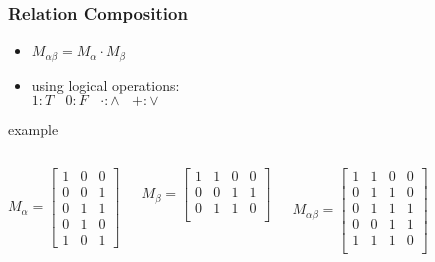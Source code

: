 \documentclass[dvipsnames]{beamer}
\begin{document}
\begin{frame}
  \frametitle{Relation Composition}

  \begin{itemize}
    \item $M_{\alpha \beta} = M_{\alpha} \cdot M_{\beta}$
    \item using logical operations:\\
      $1:T~~~~0:F~~~~\cdot:\wedge~~~~+:\vee$
  \end{itemize}

  \pause
  \begin{exampleblock}{example}
    \begin{columns}
      \[
        M_\alpha =
          \left[
            \begin{array}{ccc}
              1 & 0 & 0\\
              0 & 0 & 1\\
              0 & 1 & 1\\
              0 & 1 & 0\\
              1 & 0 & 1
           \end{array}
         \right]
      \]

      \[
        M_\beta =
          \left[
            \begin{array}{cccc}
              1 & 1 & 0 & 0\\
              0 & 0 & 1 & 1\\
              0 & 1 & 1 & 0\\
            \end{array}
          \right]
      \]

      \[
        M_{\alpha \beta} =
          \left[
            \begin{array}{cccc}
              1 & 1 & 0 & 0\\
              0 & 1 & 1 & 0\\
              0 & 1 & 1 & 1\\
              0 & 0 & 1 & 1\\
              1 & 1 & 1 & 0\\
            \end{array}
          \right]
      \]
    \end{columns}
  \end{exampleblock}
\end{frame}
\end{document}
